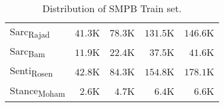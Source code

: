 \begin{table}[h]
{\begin{tabular}{@{}lrrrr@{}}
Sarc\textsubscript{Rajad}    & $41.3$K                             & $78.3$K                           & $131.5$K                           & $146.6$K                          \\
Sarc\textsubscript{Bam}      & $11.9$K                          & $22.4$K                           & $37.5$K                           & $41.6$K                           \\
Senti\textsubscript{Rosen}   & $42.8$K                          & $84.3$K                           & $154.8$K                          & $178.1$K                        \\
Stance\textsubscript{Moham}  & $2.6$K                             & $4.7$K                             & $6.4$K                            & $6.6$K                              \\ \bottomrule
\end{tabular}%
} \vspace{-5pt}
\caption{Distribution of SMPB Train set.}\label{tab:append_para}
\end{table}